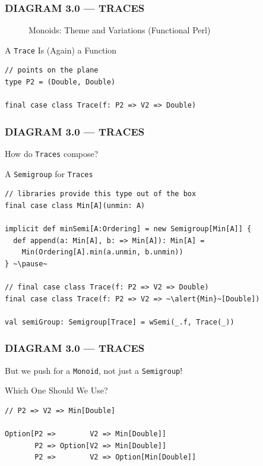 \documentclass{beamer}
\begin{document}
\begin{frame}[fragile] \frametitle{DIAGRAM 3.0 --- TRACES}
  \begin{figure}
      \centering
      \caption{Monoids: Theme and Variations (Functional Perl)}
  \end{figure}

  \begin{block}{A \texttt{Trace} Is (Again) a Function}
  \begin{lstlisting}
// points on the plane
type P2 = (Double, Double)

final case class Trace(f: P2 => V2 => Double)
  \end{lstlisting}
  \vspace{-0.4cm}
  \end{block}
\end{frame}

\begin{frame}[fragile] \frametitle{DIAGRAM 3.0 --- TRACES}
  How do \texttt{Traces} compose?

  \begin{block}{A \texttt{Semigroup} for \texttt{Traces}}
  \begin{lstlisting}
// libraries provide this type out of the box
final case class Min[A](unmin: A)

implicit def minSemi[A:Ordering] = new Semigroup[Min[A]] {
  def append(a: Min[A], b: => Min[A]): Min[A] =
    Min(Ordering[A].min(a.unmin, b.unmin))
} ~\pause~

// final case class Trace(f: P2 => V2 => Double)
final case class Trace(f: P2 => V2 => ~\alert{Min}~[Double])

val semiGroup: Semigroup[Trace] = wSemi(_.f, Trace(_))
  \end{lstlisting}
  \end{block}
\end{frame}

\begin{frame}[fragile] \frametitle{DIAGRAM 3.0 --- TRACES}
  But we push for a \texttt{Monoid}, not just a \texttt{Semigroup}!

  \begin{block}{Which One Should We Use?}
  \begin{lstlisting}
// P2 => V2 => Min[Double]

Option[P2 =>        V2 => Min[Double]]
       P2 => Option[V2 => Min[Double]]
       P2 =>        V2 => Option[Min[Double]]
  \end{lstlisting}
  \end{block}
\end{frame}
\end{document}

